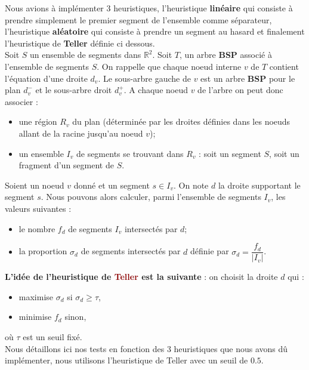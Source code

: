 \documentclass{article}
\newcommand{\red}[1]{\textcolor{darkred}{#1}}
\newcommand{\R}{\mathbb{R}}
\begin{document}
Nous avions à implémenter 3 heuristiques, l'heuristique \textbf{linéaire} qui consiste à prendre simplement le premier segment de l'ensemble comme séparateur, l'heuristique
\textbf{aléatoire} qui consiste à prendre un segment au hasard et finalement l'heuristique de \textbf{Teller} définie ci dessous. \\
Soit $S$ un ensemble de segments dans $\R^2$. Soit $T$, un arbre \textbf{BSP} associé à l'ensemble de segments $S$. On rappelle que chaque noeud interne $v$ de $T$ 
contient l'équation d'une droite $d_v$. Le sous-arbre gauche de $v$ est un arbre \textbf{BSP} pour le plan $d_v^-$ et le sous-arbre droit $d_v^+$. A chaque noeud $v$ de 
l'arbre on peut donc associer : 
\begin{itemize}
\item une région $R_v$ du plan (déterminée par les droites définies dans les noeuds allant de la racine jusqu'au noeud $v$);
\item un ensemble $I_v$ de segments se trouvant dans $R_v$ : soit un segment $S$, soit un fragment d'un segment de $S$.
\end{itemize}
\noindent Soient un noeud $v$ donné et un segment $s \in I_v$. On note $d$ la droite supportant le segment $s$. Nous pouvons alors calculer, parmi l'ensemble de segments 
$I_v$, les valeurs suivantes : 
\begin{itemize}
\item le nombre $f_d$ de segments $I_v$ intersectés par $d$;
\item la proportion $\sigma_d$ de segments intersectés par $d$ définie par $\sigma_d = \dfrac{f_d}{|I_v|}$. \\
\end{itemize}
\textbf{L'idée de l'heuristique de \red{Teller} est la suivante} : on choisit la droite $d$ qui :
\begin{itemize}
\item maximise $\sigma_d$ si $\sigma_d \geq \tau$,
\item minimise $f_d$ sinon,
\end{itemize}
\indent où $\tau$ est un seuil fixé. \\

\noindent Nous détaillons ici nos tests en fonction des 3 heuristiques que nous avons dû implémenter, nous utilisons l'heuristique de Teller avec un seuil de $0.5$. \\
\end{document}
